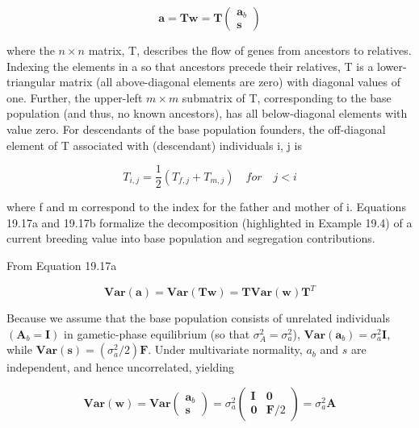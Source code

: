 \documentclass{article}
\begin{document}
\begin{equation}
\mathbf{a}=\mathbf{T}\mathbf{w}=\mathbf{T}\begin{pmatrix}\mathbf{a}_{b}\\ \mathbf{s}\end{pmatrix}
\tag{19.17a}
\label{eq:19_17a}
\end{equation}

where the  $ n \times n $ matrix, T, describes the flow of genes from ancestors to relatives. Indexing the elements in a so that ancestors precede their relatives, T is a lower-triangular matrix (all above-diagonal elements are zero) with diagonal values of one. Further, the upper-left  $ m \times m $ submatrix of T, corresponding to the base population (and thus, no known ancestors), has all below-diagonal elements with value zero. For descendants of the base population founders, the off-diagonal element of T associated with (descendant) individuals i, j is

\begin{equation}
T_{i,j}=\frac{1}{2}\left(T_{f,j}+T_{m,j}\right)\quad for\quad j<i
\tag{19.17b}
\label{eq:19_17b}
\end{equation}

where f and m correspond to the index for the father and mother of i. Equations 19.17a and 19.17b formalize the decomposition (highlighted in Example 19.4) of a current breeding value into base population and segregation contributions.

From Equation 19.17a

\begin{equation}
\mathbf{V a r}(\mathbf{a})=\mathbf{V a r}(\mathbf{T}\mathbf{w})=\mathbf{T}\mathbf{V a r}(\mathbf{w})\mathbf{T}^{T}
\tag{19.18a}
\label{eq:19_18a}
\end{equation}

Because we assume that the base population consists of unrelated individuals  $ (\mathbf{A}_b = \mathbf{I}) $ in gametic-phase equilibrium (so that  $ \sigma_A^2 = \sigma_a^2 $),  $ \mathbf{Var}(\mathbf{a}_b) = \sigma_a^2 \mathbf{I} $, while  $ \mathbf{Var}(\mathbf{s}) = (\sigma_a^2 / 2) \mathbf{F} $. Under multivariate normality,  $ a_b $ and  $ s $ are independent, and hence uncorrelated, yielding

\begin{equation}
\mathbf{V a r}(\mathbf{w})=\mathbf{V a r}\begin{pmatrix}\mathbf{a}_{b}\\ \mathbf{s}\end{pmatrix}=\sigma_{a}^{2}\begin{pmatrix}\mathbf{I}&\mathbf{0}\\ \mathbf{0}&\mathbf{F}/2\end{pmatrix}=\sigma_{a}^{2}\boldsymbol{A}
\tag{19.18b}
\label{eq:19_18b}
\end{equation}
\end{document}
